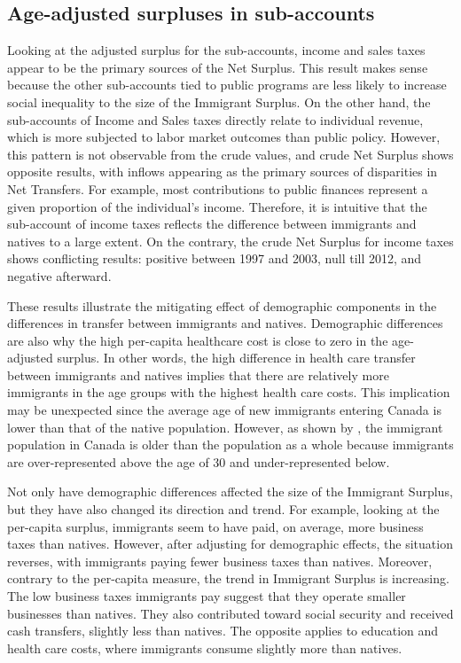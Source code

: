 \subsection{Age-adjusted surpluses in sub-accounts}

Looking at the adjusted surplus for the sub-accounts, income and sales taxes appear to be the primary sources of the Net Surplus.
This result makes sense because the other sub-accounts tied to public programs are less likely to increase social inequality to the size of the Immigrant Surplus.
On the other hand, the sub-accounts of Income and Sales taxes directly relate to individual revenue, which is more subjected to labor market outcomes than public policy.
However, this pattern is not observable from the crude values, and crude Net Surplus shows opposite results, with inflows appearing as the primary sources of disparities in Net Transfers.
For example, most contributions to public finances represent a given proportion of the individual's income.
Therefore, it is intuitive that the sub-account of income taxes reflects the difference between immigrants and natives to a large extent.
On the contrary, the crude Net Surplus for income taxes shows conflicting results: positive between 1997 and 2003, null till 2012, and negative afterward.

\vspace{0.7em}\par
These results illustrate the mitigating effect of demographic components in the differences in transfer between immigrants and natives.
Demographic differences are also why the high per-capita healthcare cost is close to zero in the age-adjusted surplus.
In other words, the high difference in health care transfer between immigrants and natives implies that there are relatively more immigrants in the age groups with the highest health care costs.
This implication may be unexpected since the average age of new immigrants entering Canada is lower than that of the native population.
However, as shown by \citet[p~244]{Malenfant.2011}, the immigrant population in Canada is older than the population as a whole because immigrants are over-represented above the age of 30 and under-represented below.

\vspace{0.7em}\par
Not only have demographic differences affected the size of the Immigrant Surplus, but they have also changed its direction and trend.
For example, looking at the per-capita surplus, immigrants seem to have paid, on average, more business taxes than natives.
However, after adjusting for demographic effects, the situation reverses, with immigrants paying fewer business taxes than natives. Moreover, contrary to the per-capita measure, the trend in Immigrant Surplus is increasing.
The low business taxes immigrants pay suggest that they operate smaller businesses than natives.
They also contributed toward social security and received cash transfers, slightly less than natives.
The opposite applies to education and health care costs, where immigrants consume slightly more than natives.

